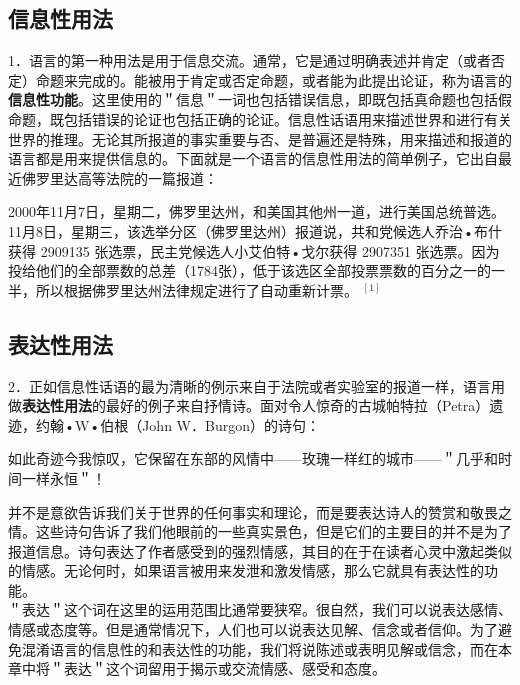 \subsection{信息性用法}

1．语言的第一种用法是用于信息交流。通常，它是通过明确表述并肯定（或者否定）命题来完成的。能被用于肯定或否定命题，或者能为此提出论证，称为语言的\textbf{信息性功能}。这里使用的＂信息＂一词也包括错误信息，即既包括真命题也包括假命题，既包括错误的论证也包括正确的论证。信息性话语用来描述世界和进行有关世界的推理。无论其所报道的事实重要与否、是普遍还是特殊，用来描述和报道的语言都是用来提供信息的。下面就是一个语言的信息性用法的简单例子，它出自最近佛罗里达高等法院的一篇报道：

\begin{displayquote}
2000年11月7日，星期二，佛罗里达州，和美国其他州一道，进行美国总统普选。11月8日，星期三，该选举分区（佛罗里达州）报道说，共和党候选人乔治•布什获得 2909135 张选票，民主党候选人小艾伯特•戈尔获得 2907351 张选票。因为投给他们的全部票数的总差（1784张），低于该选区全部投票票数的百分之一的一半，所以根据佛罗里达州法律规定进行了自动重新计票。 ${ }^{[1]}$
\end{displayquote}

\subsection{表达性用法}

2．正如信息性话语的最为清晰的例示来自于法院或者实验室的报道一样，语言用做\textbf{表达性用法}的最好的例子来自抒情诗。面对令人惊奇的古城帕特拉（Petra）遗迹，约翰•W•伯根（John W．Burgon）的诗句：

\begin{displayquote}
如此奇迹今我惊叹，它保留在东部的风情中——玫瑰一样红的城市——＂几乎和时间一样永恒＂！
\end{displayquote}

并不是意欲告诉我们关于世界的任何事实和理论，而是要表达诗人的赞赏和敬畏之情。这些诗句告诉了我们他眼前的一些真实景色，但是它们的主要目的并不是为了报道信息。诗句表达了作者感受到的强烈情感，其目的在于在读者心灵中激起类似的情感。无论何时，如果语言被用来发泄和激发情感，那么它就具有表达性的功能。\\
＂表达＂这个词在这里的运用范围比通常要狭窄。很自然，我们可以说表达感情、情感或态度等。但是通常情况下，人们也可以说表达见解、信念或者信仰。为了避免混淆语言的信息性的和表达性的功能，我们将说陈述或表明见解或信念，而在本章中将＂表达＂这个词留用于揭示或交流情感、感受和态度。

